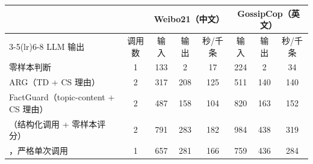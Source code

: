 \begin{tabular}{lccccccc}
\toprule
 & & \multicolumn{3}{c}{Weibo21（中文）} & \multicolumn{3}{c}{GossipCop（英文）} \\
\cmidrule(lr){3-5}\cmidrule(lr){6-8}
LLM 输出 & 调用数 & 输入 & 输出 & 秒/千条 & 输入 & 输出 & 秒/千条 \\
\midrule
零样本判断 & 1 & 133 & 2 & 17 & 224 & 2 & 34 \\
ARG（TD + CS 理由） & 2 & 317 & 208 & 125 & 511 & 140 & 140 \\
FactGuard（topic-content + CS 理由） & 2 & 487 & 158 & 104 & 820 & 163 & 152 \\
\method{}（结构化调用 + 零样本评分） & 2 & 791 & 283 & 182 & 984 & 438 & 319 \\
\method{}，严格单次调用 & 1 & 657 & 281 & 166 & 759 & 436 & 284 \\
\bottomrule
\end{tabular}
